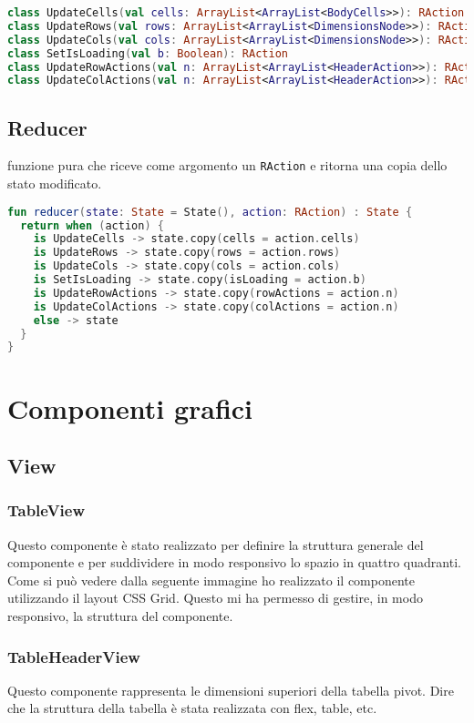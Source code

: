 \begin{lstlisting}[caption={BodyCells}, label={lst:bodycells}, language=Kotlin]
class UpdateCells(val cells: ArrayList<ArrayList<BodyCells>>): RAction
class UpdateRows(val rows: ArrayList<ArrayList<DimensionsNode>>): RAction
class UpdateCols(val cols: ArrayList<ArrayList<DimensionsNode>>): RAction
class SetIsLoading(val b: Boolean): RAction
class UpdateRowActions(val n: ArrayList<ArrayList<HeaderAction>>): RAction
class UpdateColActions(val n: ArrayList<ArrayList<HeaderAction>>): RAction
\end{lstlisting}

\subsection{Reducer}
funzione pura che riceve come argomento un \verb|RAction| e ritorna una copia dello stato modificato.
\begin{lstlisting}[caption={BodyCells}, label={lst:bodycells}, language=Kotlin]
fun reducer(state: State = State(), action: RAction) : State {
  return when (action) {
    is UpdateCells -> state.copy(cells = action.cells)
    is UpdateRows -> state.copy(rows = action.rows)
    is UpdateCols -> state.copy(cols = action.cols)
    is SetIsLoading -> state.copy(isLoading = action.b)
    is UpdateRowActions -> state.copy(rowActions = action.n)
    is UpdateColActions -> state.copy(colActions = action.n)
    else -> state
  }
}
\end{lstlisting}

\section{Componenti grafici}
\subsection{View}
\subsubsection{TableView}
Questo componente è stato realizzato per definire la struttura generale del componente e per suddividere in modo responsivo lo spazio in quattro quadranti. Come si può vedere dalla seguente immagine ho realizzato il componente utilizzando il layout CSS Grid. Questo mi ha permesso di gestire, in modo responsivo, la struttura del componente.

\subsubsection{TableHeaderView}
Questo componente rappresenta le dimensioni superiori della tabella pivot.
Dire che la struttura della tabella è stata realizzata con flex, table, etc.

